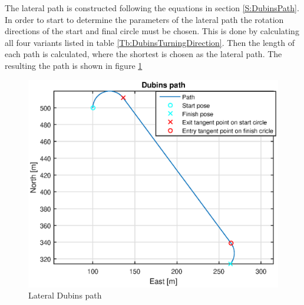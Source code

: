 The lateral path is constructed following the equations in section \ref{S:DubinsPath}. In order to start to determine the parameters of the lateral path the rotation directions of the start and final circle must be chosen. This is done by calculating all four variants listed in table \ref{Tb:DubinsTurningDirection}. Then the length of each path is calculated, where the shortest is chosen as the lateral path. The resulting the path is shown in figure \ref{Fig:LateralPath}

\begin{figure}[H]
	\centering
		\includegraphics[width=1\textwidth]{figs/SysPlot/DubinsPath.eps}
		\caption{Lateral Dubins path}
		\label{Fig:LateralPath}
\end{figure}
